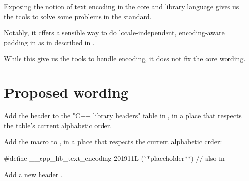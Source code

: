 \documentclass{wg21}
\begin{document}
Exposing the notion of text encoding in the core and library language gives us the tools to solve some
problems in the standard.

Notably, it offers a sensible way to do locale-independent, encoding-aware padding in  as in described in \cite{P1868}.

While this give us the tools to handle encoding, it does not fix the core wording.

\newpage


\section{Proposed wording}

Add the header  to the "C++ library headers" table in
\tcode{[headers]}, in a place that respects the table’s current alphabetic
order.

Add the macro  to , in a
place that respects the current alphabetic order:

\begin{codeblock}
#define __cpp_lib_text_encoding 201911L (**placeholder**) // also in 
\end{codeblock}

Add a new header .
\end{document}
